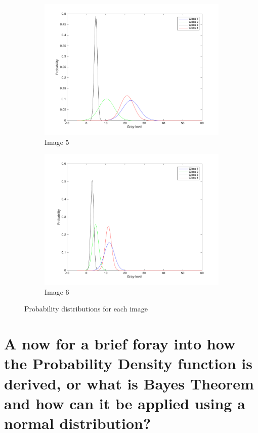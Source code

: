 \documentclass[12pt,a4paper]{report}
\begin{document}
\begin{figure}[!ht]
	\begin{subfigure}{0.5\textwidth}
	\centering
	\includegraphics[width=1.0\textwidth]{Feature5ProbabilityDistribution}	
	\caption*{Image 5}
	\end{subfigure}
	\begin{subfigure}{0.5\textwidth}
	\centering
	\includegraphics[width=1.0\textwidth]{Feature6ProbabilityDistribution}	
	\caption*{Image 6}
	\end{subfigure}
	\caption{Probability distributions for each image}
\end{figure}

\section*{A now for a brief foray into how the Probability Density function is derived, or what is Bayes Theorem and how can it be applied using a normal distribution?}
\end{document}
